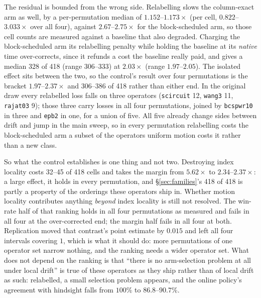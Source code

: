 \documentclass{article}
\begin{document}
The residual is bounded from the wrong side. Relabelling slows the column-exact
arm as well, by a per-permutation median of $1.152$--$1.173\times$ (per cell,
$0.822$--$3.033\times$ over all four), against $2.67$--$2.75\times$ for the
block-scheduled arm, so those cell counts are measured against a baseline that
also degraded. Charging the block-scheduled arm its relabelling penalty while
holding the baseline at its \emph{native} time over-corrects, since it refunds a
cost the baseline really paid, and gives a median 328 of 418 (range 306--333) at
$2.03\times$ (range $1.97$--$2.05$). The isolated effect sits between the two,
so the control's result over four permutations is the bracket
$1.97$--$2.37\times$ and 306--386 of 418 rather than either end. In the original
draw every relabelled loss falls on three operators
(\texttt{scircuit} 12, \texttt{wang3} 11, \texttt{rajat03} 9); those three carry
losses in all four permutations, joined by \texttt{bcspwr10} in three and
\texttt{epb2} in one, for a union of five. All five already
change sides between drift and jump in the main sweep, so in every permutation
relabelling costs the block-scheduled arm a subset of the operators uniform
motion costs it rather than a new class.

So what the control establishes is one thing and not two. Destroying index
locality costs 32--45 of 418 cells and takes the margin from $5.62\times$ to
$2.34$--$2.37\times$: a large effect, it holds in every permutation, and
\S\ref{sec:families}'s 418 of 418 is partly a property of the orderings these
operators ship in. Whether motion locality contributes anything \emph{beyond}
index locality is still not resolved. The win-rate half of that ranking holds in
all four permutations as measured and fails in all four at the over-corrected
end; the margin half fails in all four at both. Replication moved that contrast's
point estimate by $0.015$ and left all four intervals covering $1$, which is what
it should do: more permutations of one operator set narrow nothing, and the
ranking needs a wider operator set. What
does not depend on the ranking is that ``there is no arm-selection problem at
all under local drift'' is true of these operators as they ship rather than of
local drift as such: relabelled, a small selection problem appears, and the
online policy's agreement with hindsight falls from $100\%$ to
$86.8$--$90.7\%$.
\end{document}
